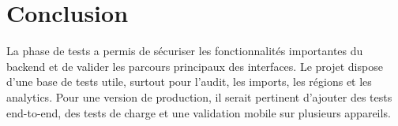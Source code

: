 \section{Conclusion}

La phase de tests a permis de sécuriser les fonctionnalités importantes du backend et de valider les
parcours principaux des interfaces. Le projet dispose d'une base de tests utile, surtout pour l'audit, les
imports, les régions et les analytics. Pour une version de production, il serait pertinent d'ajouter des
tests end-to-end, des tests de charge et une validation mobile sur plusieurs appareils.
